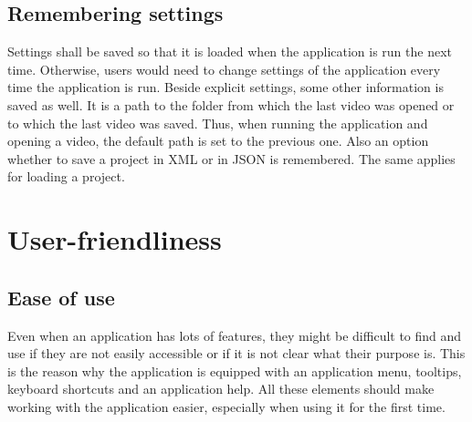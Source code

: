 \subsection{Remembering settings}
Settings shall be saved so that it is loaded when the application is run the next time. Otherwise, users would need to change settings of the application every time the application is run. Beside explicit settings, some other information is saved as well. It is a path to the folder from which the last video was opened or to which the last video was saved. Thus, when running the application and opening a video, the default path is set to the previous one. Also an option whether to save a project in XML or in JSON is remembered. The same applies for loading a project.


\section{User-friendliness}
\subsection{Ease of use}
Even when an application has lots of features, they might be difficult to find and use if they are not easily accessible or if it is not clear what their purpose is. This is the reason why the application is equipped with an application menu, tooltips, keyboard shortcuts and an application help. All these elements should make working with the application easier, especially when using it for the first time.

